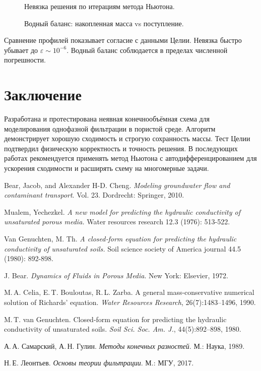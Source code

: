 \documentclass[a4paper,12pt]{article}
\begin{document}
\begin{figure}[ht]
  \centering
  \caption{Невязка решения по итерациям метода Ньютона.}
  \label{fig:residual}
\end{figure}

\begin{figure}[ht]
  \centering
  \caption{Водный баланс: накопленная масса vs поступление.}
  \label{fig:balance}
\end{figure}

Сравнение профилей показывает согласие с данными Целии. Невязка быстро убывает до $\varepsilon\sim10^{-6}$. Водный баланс соблюдается в пределах численной погрешности.

\section{Заключение}
Разработана и протестирована неявная конечнообъёмная схема для моделирования однофазной фильтрации в пористой среде. Алгоритм демонстрирует хорошую сходимость и строгую сохранность массы. Тест Целии подтвердил физическую корректность и точность решения. В последующих работах рекомендуется применять метод Ньютона с автодифференцированием для ускорения сходимости и расширять схему на многомерные задачи.

\begin{thebibliography}{9}
	Bear, Jacob, and Alexander H-D. Cheng. \textit{Modeling groundwater flow and contaminant transport}. Vol. 23. Dordrecht: Springer, 2010.
	
	Mualem, Yechezkel. \textit{A new model for predicting the hydraulic conductivity of unsaturated porous media.} Water resources research 12.3 (1976): 513-522.
	
	Van Genuchten, M. Th. \textit{A closed‐form equation for predicting the hydraulic conductivity of unsaturated soils.} Soil science society of America journal 44.5 (1980): 892-898.
	
J. Bear. \emph{Dynamics of Fluids in Porous Media}. New York: Elsevier, 1972.

M.\,A. Celia, E.\,T. Bouloutas, R.\,L. Zarba. A general mass-conservative numerical solution of Richards' equation. \emph{Water Resources Research}, 26(7):1483–1496, 1990.

M.\,T. van Genuchten. Closed-form equation for predicting the hydraulic conductivity of unsaturated soils. \emph{Soil Sci. Soc. Am. J.}, 44(5):892–898, 1980.

А.\,А. Самарский, А.\,Н. Гулин. \emph{Методы конечных разностей}. М.: Наука, 1989.

Н.\,Е. Леонтьев. \emph{Основы теории фильтрации}. М.: МГУ, 2017.
\end{thebibliography}

\end{document}
